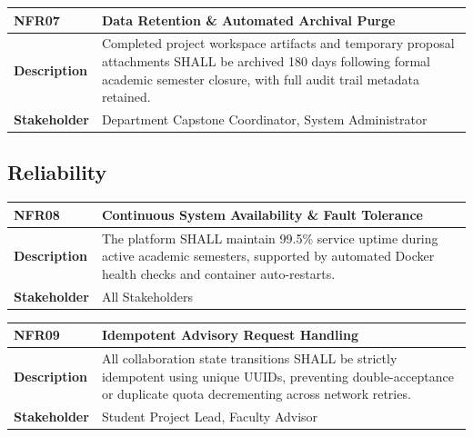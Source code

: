 \begin{table}[H]
\centering
\small
\begin{tabularx}{\textwidth}{|l|X|}
\hline
\rowcolor{lightgray!40} \textbf{NFR07} & \textbf{Data Retention \& Automated Archival Purge} \\ \hline
\textbf{Description} & Completed project workspace artifacts and temporary proposal attachments SHALL be archived 180 days following formal academic semester closure, with full audit trail metadata retained. \\ \hline
\textbf{Stakeholder} & Department Capstone Coordinator, System Administrator \\ \hline
\end{tabularx}
\end{table}

\subsection{Reliability}
\label{subsec:nfr_reliability}

\begin{table}[H]
\centering
\small
\begin{tabularx}{\textwidth}{|l|X|}
\hline
\rowcolor{lightgray!40} \textbf{NFR08} & \textbf{Continuous System Availability \& Fault Tolerance} \\ \hline
\textbf{Description} & The platform SHALL maintain 99.5\% service uptime during active academic semesters, supported by automated Docker health checks and container auto-restarts. \\ \hline
\textbf{Stakeholder} & All Stakeholders \\ \hline
\end{tabularx}
\end{table}

\begin{table}[H]
\centering
\small
\begin{tabularx}{\textwidth}{|l|X|}
\hline
\rowcolor{lightgray!40} \textbf{NFR09} & \textbf{Idempotent Advisory Request Handling} \\ \hline
\textbf{Description} & All collaboration state transitions SHALL be strictly idempotent using unique UUIDs, preventing double-acceptance or duplicate quota decrementing across network retries. \\ \hline
\textbf{Stakeholder} & Student Project Lead, Faculty Advisor \\ \hline
\end{tabularx}
\end{table}

